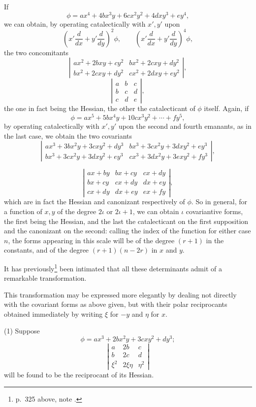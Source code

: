 \documentclass[11pt]{article}
\newcommand{\sourcepage}[1]{\marginpar{\scriptsize p.~#1}}
\begin{document}
If
\[
\phi=ax^4+4bx^3y+6cx^2y^2+4dxy^3+ey^4,
\]
we can obtain, by operating catalectically with $x',y'$ upon
\[
\left(x'\frac{d}{dx}+y'\frac{d}{dy}\right)^2\phi,\qquad
\left(x'\frac{d}{dx}+y'\frac{d}{dy}\right)^4\phi,
\]
the two concomitants
\[
\left|\begin{array}{cc}
ax^2+2bxy+cy^2&bx^2+2cxy+dy^2\\
bx^2+2cxy+dy^2&cx^2+2dxy+ey^2
\end{array}\right|,
\tag{1}
\]
\[
\left|\begin{array}{ccc}
a&b&c\\
b&c&d\\
c&d&e
\end{array}\right|,
\tag{2}
\]
the one in fact being the Hessian, the other the catalecticant of $\phi$ itself. Again, if
\[
\phi=ax^5+5bx^4y+10cx^3y^2+\cdots+fy^5,
\]
by operating catalectically with $x',y'$ upon the second and fourth emanants, as in the last case, we obtain the two covariants
\[
\left|\begin{array}{cc}
ax^3+3bx^2y+3cxy^2+dy^3&bx^3+3cx^2y+3dxy^2+ey^3\\
bx^3+3cx^2y+3dxy^2+ey^3&cx^3+3dx^2y+3exy^2+fy^3
\end{array}\right|,
\tag{1}
\]

\sourcepage{343}
\[
\left|\begin{array}{ccc}
ax+by&bx+cy&cx+dy\\
bx+cy&cx+dy&dx+ey\\
cx+dy&dx+ey&ex+fy
\end{array}\right|,
\tag{2}
\]
which are in fact the Hessian and canonizant respectively of $\phi$. So in general, for a function of $x,y$ of the degree $2\iota$ or $2\iota+1$, we can obtain $\iota$ covariantive forms, the first being the Hessian, and the last the catalecticant on the first supposition and the canonizant on the second: calling the index of the function for either case $n$, the forms appearing in this scale will be of the degree $(r+1)$ in the constants, and of the degree $(r+1)(n-2r)$ in $x$ and $y$.

It has previously\footnote{p.~325 above, note {\dag}.} been intimated that all these determinants admit of a remarkable transformation.

This transformation may be expressed more elegantly by dealing not directly with the covariant forms as above given, but with their polar reciprocants obtained immediately by writing $\xi$ for $-y$ and $\eta$ for $x$.

(1) Suppose
\[
\phi=ax^3+2bx^2y+3cxy^2+dy^3;
\]
\[
\left|\begin{array}{ccc}
a&2b&c\\
b&2c&d\\
\xi^2&2\xi\eta&\eta^2
\end{array}\right|
\]
will be found to be the reciprocant of its Hessian.
\end{document}
